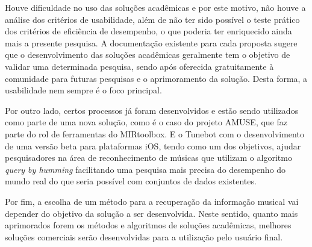 Houve dificuldade no uso das soluções acadêmicas e por este motivo, não houve a análise dos critérios de usabilidade, além de não ter sido possível o teste prático dos critérios de eficiência de desempenho, o que poderia ter enriquecido ainda mais a presente pesquisa. A documentação existente para cada proposta sugere que o desenvolvimento das soluções acadêmicas geralmente tem o objetivo de validar uma determinada pesquisa, sendo após oferecida gratuitamente à comunidade para futuras pesquisas e o aprimoramento da solução. Desta forma, a usabilidade nem sempre é o foco principal. 

Por outro lado, certos processos já foram desenvolvidos e estão sendo utilizados como parte de uma nova solução, como é o caso do projeto AMUSE, que faz parte do rol de ferramentas do MIRtoolbox. E o Tunebot com o desenvolvimento de uma versão beta para plataformas iOS, tendo como um dos objetivos, ajudar pesquisadores na área de reconhecimento de músicas que utilizam o algoritmo \textit{query by humming} facilitando uma pesquisa mais precisa do desempenho do mundo real do que seria possível com conjuntos de dados existentes.

Por fim, a escolha de um método para a recuperação da informação musical vai depender do objetivo da solução a ser desenvolvida. Neste sentido, quanto mais aprimorados forem os métodos e algoritmos de soluções acadêmicas, melhores soluções comerciais serão desenvolvidas para a utilização pelo usuário final.


